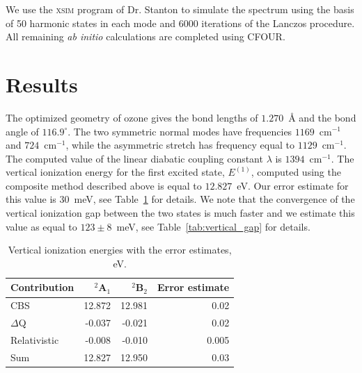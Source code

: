 \documentclass[12pt,a4paper,prb,aps,superscriptaddress]{revtex4}
\begin{document}
We use the \textsc{xsim} program of Dr. Stanton to simulate the spectrum using
the basis of 50 harmonic states in each mode and 6000 iterations of the
Lanczos procedure. All remaining \emph{ab initio} calculations are completed
using \textsc{CFOUR}.~\cite{cfour, cfour:2020}


\section{Results}


The optimized geometry of ozone gives the bond lengths of $1.270$~\AA{} and
the bond angle of $116.9^\circ$. The two symmetric normal modes have
frequencies $1169$~cm$^{-1}$ and $724$~cm$^{-1}$, while the asymmetric stretch
has frequency equal to $1129$~cm$^{-1}$. The computed value of the linear
diabatic coupling constant $\lambda$ is $1394$~cm$^{-1}$. The vertical
ionization energy for the first excited state, $E^{(1)}$, computed using the
composite method described above is equal to $12.827$~eV. Our error estimate
for this value is $30$~meV, see Table~\ref{tab:vertical_ionization_energy} for
details.  We note that the convergence of the vertical ionization gap between
the two states is much faster and we estimate this value as equal to
$123\pm8$~meV, see Table~\ref{tab:vertical_gap} for details. 

\begin{table}
    \caption{
        Vertical ionization energies with the error estimates, eV.
    }
    \label{tab:vertical_ionization_energy}
    \begin{center}
        \begin{tabular}[c]{|l|rr|r|}
            \hline
            Contribution  & $^2$A$_1$ & $^2$B$_2$ & Error estimate \\ \hline
            CBS           & 12.872    & 12.981    & 0.02 \\
            $\Delta$Q     & -0.037    & -0.021    & 0.02 \\
            Relativistic  & -0.008    & -0.010    & 0.005 \\ \hline
            Sum           & 12.827    & 12.950    & 0.03 \\ \hline
        \end{tabular}
    \end{center}
\end{table}
\end{document}
